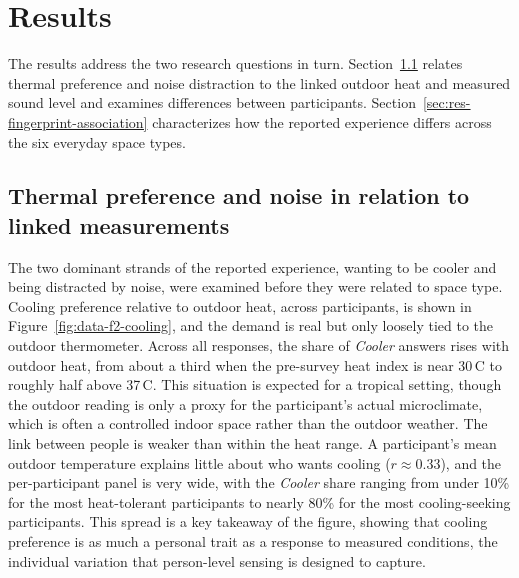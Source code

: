 \documentclass[]{interact}
\begin{document}
\section{Results}\label{sec:results}

The results address the two research questions in turn.
Section~\ref{sec:res-thermal-noise} relates thermal preference and noise distraction to the linked outdoor heat and measured sound level and examines differences between participants.
Section~\ref{sec:res-fingerprint-association} characterizes how the reported experience differs across the six everyday space types.

\subsection{Thermal preference and noise in relation to linked measurements}\label{sec:res-thermal-noise}

The two dominant strands of the reported experience, wanting to be cooler and being distracted by noise, were examined before they were related to space type. 
Cooling preference relative to outdoor heat, across participants, is shown in Figure~\ref{fig:data-f2-cooling}, and the demand is real but only loosely tied to the outdoor thermometer.
Across all responses, the share of \emph{Cooler} answers rises with outdoor heat, from about a third when the pre-survey heat index is near 30\,\textdegree C to roughly half above 37\,\textdegree C.
This situation is expected for a tropical setting, though the outdoor reading is only a proxy for the participant's actual microclimate, which is often a controlled indoor space rather than the outdoor weather.
The link between people is weaker than within the heat range.
A participant's mean outdoor temperature explains little about who wants cooling ($r \approx 0.33$), and the per-participant panel is very wide, with the \emph{Cooler} share ranging from under 10\% for the most heat-tolerant participants to nearly 80\% for the most cooling-seeking participants.
This spread is a key takeaway of the figure, showing that cooling preference is as much a personal trait as a response to measured conditions, the individual variation that person-level sensing is designed to capture.
\end{document}
